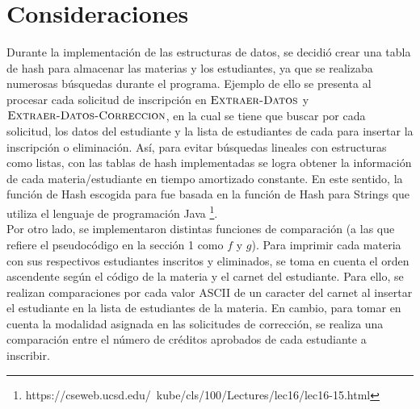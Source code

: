 \documentclass[11pt]{article}
\begin{document}
\section{Consideraciones}
Durante la implementación de las estructuras de datos, se decidió crear una tabla de hash para
almacenar las materias y los estudiantes, ya que se realizaba numerosas búsquedas durante el programa. 
Ejemplo de ello se presenta al procesar cada solicitud de inscripción en $\textnormal{\scshape Extraer-Datos}$
y $\textnormal{\scshape Extraer-Datos-Correccion}$, en la cual se tiene que buscar por cada solicitud, los datos
del estudiante y la lista de estudiantes de cada  para insertar la inscripción o eliminación. 
Así, para evitar búsquedas lineales con estructuras como listas, con las tablas de hash implementadas se logra 
obtener la información de cada materia/estudiante en tiempo amortizado constante. En este sentido, la función 
de Hash escogida para  fue basada en la función de Hash para Strings que utiliza el lenguaje 
de programación Java \footnote{https://cseweb.ucsd.edu/~kube/cls/100/Lectures/lec16/lec16-15.html}. \\

Por otro lado, se implementaron distintas funciones de comparación (a las que refiere el pseudocódigo en
la sección 1 como $f$ y $g$). Para imprimir cada materia con sus
respectivos estudiantes inscritos y eliminados, se toma en cuenta el orden ascendente según el código
de la materia y el carnet del estudiante. Para ello, se realizan comparaciones por cada valor ASCII de 
un caracter del carnet al insertar el estudiante en la lista de estudiantes de la materia. 
En cambio, para tomar en cuenta la modalidad asignada en las solicitudes de corrección, se realiza una 
comparación entre el número de créditos aprobados de cada estudiante a inscribir. \\
\end{document}
